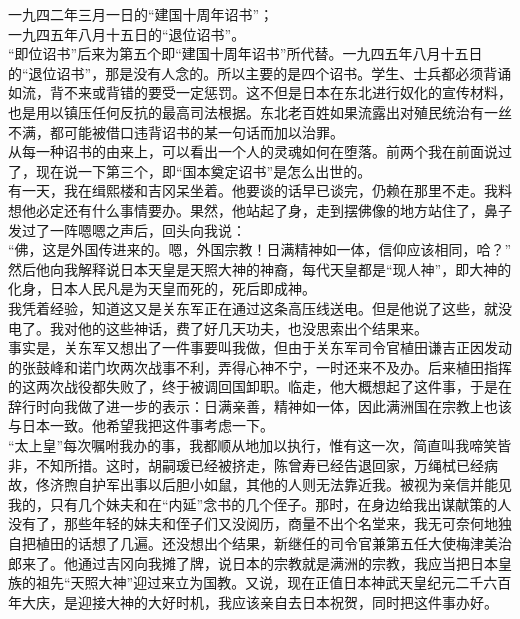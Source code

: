 一九四二年三月一日的“建国十周年诏书”；\\

一九四五年八月十五日的“退位诏书”。\\

“即位诏书”后来为第五个即“建国十周年诏书”所代替。一九四五年八月十五日的“退位诏书”，那是没有人念的。所以主要的是四个诏书。学生、士兵都必须背诵如流，背不来或背错的要受一定惩罚。这不但是日本在东北进行奴化的宣传材料，也是用以镇压任何反抗的最高司法根据。东北老百姓如果流露出对殖民统治有一丝不满，都可能被借口违背诏书的某一句话而加以治罪。\\

从每一种诏书的由来上，可以看出一个人的灵魂如何在堕落。前两个我在前面说过了，现在说一下第三个，即“国本奠定诏书”是怎么出世的。\\

有一天，我在缉熙楼和吉冈呆坐着。他要谈的话早已谈完，仍赖在那里不走。我料想他必定还有什么事情要办。果然，他站起了身，走到摆佛像的地方站住了，鼻子发过了一阵嗯嗯之声后，回头向我说：\\

“佛，这是外国传进来的。嗯，外国宗教！日满精神如一体，信仰应该相同，哈？”\\

然后他向我解释说日本天皇是天照大神的神裔，每代天皇都是“现人神”，即大神的化身，日本人民凡是为天皇而死的，死后即成神。\\

我凭着经验，知道这又是关东军正在通过这条高压线送电。但是他说了这些，就没电了。我对他的这些神话，费了好几天功夫，也没思索出个结果来。\\

事实是，关东军又想出了一件事要叫我做，但由于关东军司令官植田谦吉正因发动的张鼓峰和诺门坎两次战事不利，弄得心神不宁，一时还来不及办。后来植田指挥的这两次战役都失败了，终于被调回国卸职。临走，他大概想起了这件事，于是在辞行时向我做了进一步的表示：日满亲善，精神如一体，因此满洲国在宗教上也该与日本一致。他希望我把这件事考虑一下。\\

“太上皇”每次嘱咐我办的事，我都顺从地加以执行，惟有这一次，简直叫我啼笑皆非，不知所措。这时，胡嗣瑗已经被挤走，陈曾寿已经告退回家，万绳栻已经病故，佟济煦自护军出事以后胆小如鼠，其他的人则无法靠近我。被视为亲信并能见我的，只有几个妹夫和在“内延”念书的几个侄子。那时，在身边给我出谋献策的人没有了，那些年轻的妹夫和侄子们又没阅历，商量不出个名堂来，我无可奈何地独自把植田的话想了几遍。还没想出个结果，新继任的司令官兼第五任大使梅津美治郎来了。他通过吉冈向我摊了牌，说日本的宗教就是满洲的宗教，我应当把日本皇族的祖先“天照大神”迎过来立为国教。又说，现在正值日本神武天皇纪元二千六百年大庆，是迎接大神的大好时机，我应该亲自去日本祝贺，同时把这件事办好。\\

